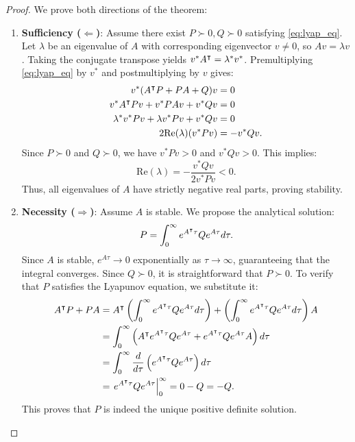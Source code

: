 \begin{proof}
We prove both directions of the theorem:
\begin{enumerate}
    \item \textbf{Sufficiency ($\Leftarrow$)}: Assume there exist $P \succ 0, Q \succ 0$ satisfying \eqref{eq:lyap_eq}. Let $\lambda$ be an eigenvalue of $A$ with corresponding eigenvector $v \neq 0$, so $Av = \lambda v$.
    Taking the conjugate transpose yields $v^* A^\intercal = \lambda^* v^*$.
    Premultiplying \eqref{eq:lyap_eq} by $v^*$ and postmultiplying by $v$ gives:
    \begin{align}
        v^* (A^\intercal P + P A + Q) v &= 0 \nonumber \\
        v^* A^\intercal P v + v^* P A v + v^* Q v &= 0 \nonumber \\
        \lambda^* v^* P v + \lambda v^* P v + v^* Q v &= 0 \nonumber \\
2 \text{Re}(\lambda) (v^* P v) &= -v^* Q v .
    \end{align}
    Since $P \succ 0$ and $Q \succ 0$, we have $v^* P v > 0$ and $v^* Q v > 0$. This implies:
    \begin{equation}
\text{Re}(\lambda) = -\frac{v^* Q v}{2 v^* P v} < 0 .
    \end{equation}
    Thus, all eigenvalues of $A$ have strictly negative real parts, proving stability.
    \item \textbf{Necessity ($\Rightarrow$)}: Assume $A$ is stable. We propose the analytical solution:
    \begin{equation}
P = \int_0^\infty e^{A^\intercal \tau} Q e^{A \tau} d\tau .
    \end{equation}
    Since $A$ is stable, $e^{A\tau} \to 0$ exponentially as $\tau \to \infty$, guaranteeing that the integral converges. Since $Q \succ 0$, it is straightforward that $P \succ 0$.
    To verify that $P$ satisfies the Lyapunov equation, we substitute it:
    \begin{align}
        A^\intercal P + P A &= A^\intercal \left( \int_0^\infty e^{A^\intercal \tau} Q e^{A \tau} d\tau \right) + \left( \int_0^\infty e^{A^\intercal \tau} Q e^{A \tau} d\tau \right) A \nonumber \\
        &= \int_0^\infty \left( A^\intercal e^{A^\intercal \tau} Q e^{A \tau} + e^{A^\intercal \tau} Q e^{A \tau} A \right) d\tau \nonumber \\
        &= \int_0^\infty \frac{d}{d\tau} \left( e^{A^\intercal \tau} Q e^{A \tau} \right) d\tau \nonumber \\
&= \left. e^{A^\intercal \tau} Q e^{A \tau} \right|_0^\infty = 0 - Q = -Q .
    \end{align}
    This proves that $P$ is indeed the unique positive definite solution.
\end{enumerate}
\end{proof}

